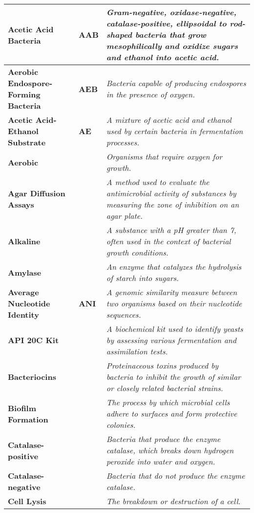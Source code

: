 \begin{longtable}{| p{5cm} | p{2cm} | p{7.5cm} |}
    \textbf{Acetic Acid Bacteria} & \textbf{AAB} & \textit{Gram-negative, oxidase-negative, catalase-positive, ellipsoidal to rod-shaped bacteria that grow mesophilically and oxidize sugars and ethanol into acetic acid.} \\
    \hline
    \textbf{Aerobic Endospore-Forming Bacteria} & \textbf{AEB} & \textit{Bacteria capable of producing endospores in the presence of oxygen.} \\
    \hline
    \textbf{Acetic Acid-Ethanol Substrate} & \textbf{AE} & \textit{A mixture of acetic acid and ethanol used by certain bacteria in fermentation processes.} \\
    \hline
    \textbf{Aerobic} &  & \textit{Organisms that require oxygen for growth.} \\
    \hline
    \textbf{Agar Diffusion Assays} &  & \textit{A method used to evaluate the antimicrobial activity of substances by measuring the zone of inhibition on an agar plate.} \\
    \hline
    \textbf{Alkaline} &  & \textit{A substance with a pH greater than 7, often used in the context of bacterial growth conditions.} \\
    \hline
    \textbf{Amylase} &  & \textit{An enzyme that catalyzes the hydrolysis of starch into sugars.} \\
    \hline
    \textbf{Average Nucleotide Identity} & \textbf{ANI} & \textit{A genomic similarity measure between two organisms based on their nucleotide sequences.} \\
    \hline
    \textbf{API 20C Kit} &  & \textit{A biochemical kit used to identify yeasts by assessing various fermentation and assimilation tests.} \\
    \hline
    \textbf{Bacteriocins} &  & \textit{Proteinaceous toxins produced by bacteria to inhibit the growth of similar or closely related bacterial strains.} \\
    \hline
    \textbf{Biofilm Formation} &  & \textit{The process by which microbial cells adhere to surfaces and form protective colonies.} \\
    \hline
    \textbf{Catalase-positive} &  & \textit{Bacteria that produce the enzyme catalase, which breaks down hydrogen peroxide into water and oxygen.} \\
    \hline
    \textbf{Catalase-negative} &  & \textit{Bacteria that do not produce the enzyme catalase.} \\
    \hline
    \textbf{Cell Lysis} &  & \textit{The breakdown or destruction of a cell.} \\

\end{longtable}

